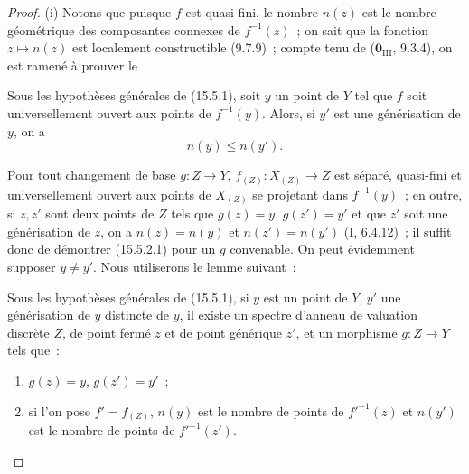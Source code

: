 \begin{proof}
(i) Notons que puisque $f$ est quasi-fini, le nombre $n(z)$ est le nombre géométrique des composantes connexes de $f^{-1}(z)$~; on sait que la fonction $z\mapsto n(z)$ est localement constructible (9.7.9)~; compte tenu de ($\mathbf{0}_{\mathrm{III}}$, 9.3.4), on est ramené à prouver le

\begin{corollary}[15.5.2]
\label{IV.15.5.2-fr}
Sous les hypothèses générales de (15.5.1), soit $y$ un point de $Y$ tel que $f$ soit universellement ouvert aux points de $f^{-1}(y)$. Alors, si $y'$ est une générisation de $y$, on a
\begin{equation}
\tag{15.5.2.1}
\label{IV.15.5.2.1-fr}
  n(y)\leqslant n(y').
\end{equation}
\end{corollary}

Pour tout changement de base $g:Z\to Y$, $f_{(Z)}:X_{(Z)}\to Z$ est séparé, quasi-fini et universellement ouvert aux points de $X_{(Z)}$ se projetant dans $f^{-1}(y)$~; en outre, si $z,z'$ sont deux points de $Z$ tels que $g(z)=y$, $g(z')=y'$ et que $z'$ soit une générisation de $z$, on a $n(z)=n(y)$ et $n(z')=n(y')$ (I, 6.4.12)~; il suffit donc de démontrer (15.5.2.1) pour un $g$ convenable. On peut évidemment supposer $y\ne y'$. Nous utiliserons le lemme suivant~:

\begin{lemma}[15.5.2.2]
\label{IV.15.5.2.2-fr}
Sous les hypothèses générales de (15.5.1), si $y$ est un point de $Y$, $y'$ une générisation de $y$ distincte de $y$, il existe un spectre d'anneau de valuation discrète $Z$, de point fermé $z$ et de point générique $z'$, et un morphisme $g:Z\to Y$ tels que~:
\begin{enumerate}[label=\emph{\arabic*\textsuperscript{\textdegree}}]
  \item $g(z)=y$, $g(z')=y'$~;
  \item si l'on pose $f'=f_{(Z)}$, $n(y)$ est le nombre de points de $f'^{-1}(z)$ et $n(y')$ est le nombre de points de $f'^{-1}(z')$.
\end{enumerate}
\end{lemma}


\end{proof}
